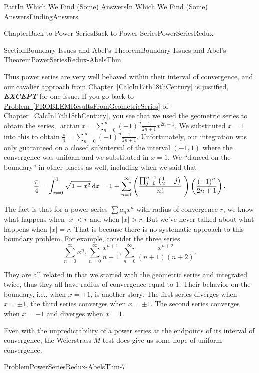 \documentclass[oneside,10pt,]{book}
\newcommand{\xreffont}{\relax}
\newcommand{\alert}[1]{\textbf{\textit{#1}}}
\numberwithin{equation}{part}
\newcommand{\dx}[1]{\,{\rm d}#1}
\newcommand{\abs}[1]{\left|#1\right|}
\newcommand{\lt}{<}
\begin{document}
\begin{partptx}{Part}{In Which We Find (Some) Answers}{}{In Which We Find (Some) Answers}{}{}{FindingAnswers}
\begin{chapterptx}{Chapter}{Back to Power Series}{}{Back to Power Series}{}{}{PowerSeriesRedux}
\begin{sectionptx}{Section}{Boundary Issues and Abel's Theorem}{}{Boundary Issues and Abel's Theorem}{}{}{PowerSeriesRedux-AbelsThm}
\par
Thus power series are very well behaved within their interval of convergence, and our cavalier approach from \hyperref[CalcIn17th18thCentury]{Chapter~{\xreffont\ref{CalcIn17th18thCentury}}} is justified, \alert{EXCEPT} for one issue.  If you go back to \hyperref[PROBLEMResultsFromGeometricSeries]{Problem~{\xreffont\ref{PROBLEMResultsFromGeometricSeries}}} of \hyperref[CalcIn17th18thCentury]{Chapter~{\xreffont\ref{CalcIn17th18thCentury}}}, you see that we used the geometric series to obtain the series, \(\arctan x
=\displaystyle\sum_{n=0}^\infty(-1)^n\frac{1}{2n+1}x^{2n+1}\).  We substituted \(x=1\) into this to obtain \(\frac{\pi}{4}=\displaystyle\sum_{n=0}^\infty(-1)^n\frac{1}{2n+1}\). Unfortunately, our integration was only guaranteed on a closed subinterval of the interval \((-1,1)\) where the convergence was uniform and we substituted in \(x=1\).  We ``danced on the boundary'' in other places as well, including when we said that%
\begin{equation*}
\frac{\pi}{4}=\int_{x=0}^1\sqrt{1-x^2}\dx{x}=1+\displaystyle\sum_{n=1}^\infty\left(\frac{\prod_{j=0}^{n-1}\left(\frac{1}{2}-j\right)}{n!}\text{ } \right)\left(\frac{\left(-1\right)^n}{2n+1}\right)\text{.}
\end{equation*}
%
\par
The fact is that for a power series \(\sum a_nx^n\) with radius of convergence \(r\), we know what happens when \(\abs{x}\lt r\) and when \(\abs{x}>r\). But we've never talked about what happens when \(\abs{x}=r\).  That is because there is no systematic approach to this boundary problem.  For example, consider the three series%
\begin{equation*}
\sum_{n=0}^\infty x^n,\sum_{n=0}^\infty\frac{x^{n+1}}{n+1}, \sum_{n=0}^\infty\frac{x^{n+2}}{(n+1)(n+2)}\text{.}
\end{equation*}
%
\par
They are all related in that we started with the geometric series and integrated twice, thus they all have radius of convergence equal to 1.  Their behavior on the boundary, i.e., when \(x=\pm 1\), is another story.  The first series diverges when \(x=\pm 1\), the third series converges when \(x=\pm 1\).  The second series converges when \(x=-1\) and diverges when \(x=1\).%
\par
Even with the unpredictability of a power series at the endpoints of its interval of convergence, the Weierstrass-\(M\) test does give us some hope of uniform convergence.%
\begin{problem}{Problem}{}{PowerSeriesRedux-AbelsThm-7}%

\end{problem}
\end{sectionptx}
\end{chapterptx}
\end{partptx}
\end{document}
